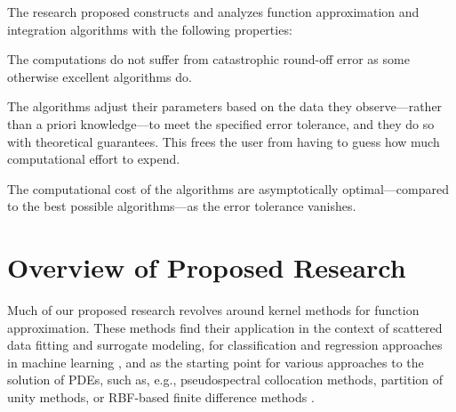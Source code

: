 \documentclass[11pt]{NSFamsart}
\begin{document}
The research proposed constructs and analyzes function approximation and integration algorithms with the following properties:
\begin{description}[leftmargin=2.5ex]
\item[Stability] The computations do not suffer from catastrophic round-off error as some otherwise excellent algorithms do.

\item[Adaptivity] The algorithms adjust their parameters based on the data they observe---rather than a priori knowledge---to meet the specified error tolerance, and they do so with theoretical guarantees.  This frees the user from having to guess how much computational effort to expend.

\item[Efficiency] The computational cost of the algorithms are asymptotically optimal---compared to the best possible algorithms---as the error tolerance vanishes.
\end{description}

\section{Overview of Proposed Research}
Much of our proposed research revolves around kernel methods for function approximation\citep{Fas07a,SchWen06a,Wen05a}. These methods find their application in the context of scattered data fitting and surrogate modeling, for classification and regression approaches in machine learning \citep{HasTibFrie01}, and as the starting point for various approaches to the solution of PDEs, such as, e.g., pseudospectral collocation methods, partition of unity methods, or RBF-based finite difference methods \citep{Fas07a,FornbergFlyer15}.
\end{document}
